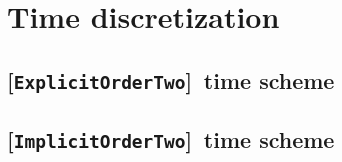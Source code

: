 \documentclass[11pt,a4paper]{article}
\newcommand{\keyword}[1]{[\texttt{\textbf{#1}}]\!\,}
\begin{document}
\section{Time discretization}
\subsection{\keyword{ExplicitOrderTwo} time scheme}

\subsection{\keyword{ImplicitOrderTwo} time scheme}
\end{document}
